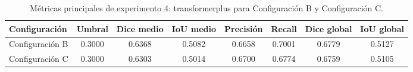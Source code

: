 \begin{table}[H]
    \centering
    \small
    \caption{Métricas principales de experimento 4: transformerplus para Configuración B y Configuración C.}
    \label{tab:experimento04transformerplus_metricas_principales}
    \begin{tabular}{lccccccc}
        \toprule
        Configuración & Umbral & Dice medio & IoU medio & Precisión & Recall & Dice global & IoU global \\
        \midrule
        Configuración B & 0.3000 & 0.6368 & 0.5082 & 0.6658 & 0.7001 & 0.6779 & 0.5127 \\
        Configuración C & 0.3000 & 0.6303 & 0.5014 & 0.6700 & 0.6774 & 0.6759 & 0.5105 \\
        \bottomrule
    \end{tabular}
\end{table}
